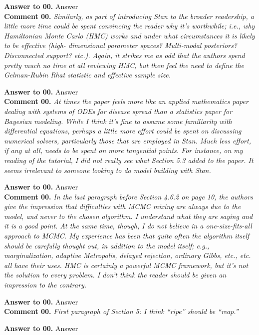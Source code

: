 \documentclass[12pt]{article}
\newcounter{question}
\newcommand{\name}{00}
\newcommand{\question}[1]{\stepcounter{question} \noindent \textbf{Comment \name.\thequestion} \emph{#1} }
\newcommand{\answer}[1]{\noindent \textbf{Answer to \name.\thequestion} #1 \mbox{}\\}
\begin{document}
	\answer{Answer}
	
		\question{Similarly, as part of introducing Stan to the broader readership, a little more time
			could be spent convincing the reader why it’s worthwhile; i.e., why Hamiltonian Monte
			Carlo (HMC) works and under what circumstances it is likely to be effective (high-
			dimensional parameter spaces? Multi-modal posteriors? Disconnected support? etc.).
			Again, it strikes me as odd that the authors spend pretty much no time at all reviewing
			HMC, but then feel the need to define the Gelman-Rubin Rhat statistic and effective
			sample size.}
	
	\answer{Answer}
	
	\question{At times the paper feels more like an applied mathematics paper dealing with systems
		of ODEs for disease spread than a statistics paper for Bayesian modeling. While I
		think it’s fine to assume some familiarity with differential equations, perhaps a little
		more effort could be spent on discussing numerical solvers, particularly those that are
		employed in Stan. Much less effort, if any at all, needs to be spent on more tangential
		points. For instance, on my reading of the tutorial, I did not really see what Section
		5.3 added to the paper. It seems irrelevant to someone looking to do model building
		with Stan.}
	
	\answer{Answer}
	
	\question{In the last paragraph before Section 4.6.2 on page 10, the authors give the impression
		that difficulties with MCMC mixing are always due to the model, and never to the
		chosen algorithm. I understand what they are saying and it is a good point. At the
		same time, though, I do not believe in a one-size-fits-all approach to MCMC. My
		experience has been that quite often the algorithm itself should be carefully thought
		out, in addition to the model itself; e.g., marginalization, adaptive Metropolis, delayed
		rejection, ordinary Gibbs, etc., etc. all have their uses. HMC is certainly a powerful
		MCMC framework, but it’s not the solution to every problem. I don’t think the reader
		should be given an impression to the contrary.}
	
	\answer{Answer}
	
	\question{First paragraph of Section 5: I think “ripe” should be “reap.”}
	
	\answer{Answer}
	
	
	
	
\end{document}
